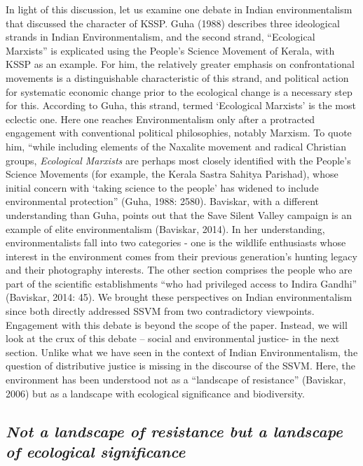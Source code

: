 \documentclass[twoside, 13pt]{article}
\begin{document}
{{{{In light of this discussion, let us examine one debate in Indian environmentalism that discussed the character of KSSP. Guha (1988) describes three ideological strands in Indian Environmentalism, and the second strand, “Ecological Marxists” is explicated using the People’s Science Movement of Kerala, with KSSP as an example. For him, the relatively greater emphasis on confrontational movements is a distinguishable characteristic of this strand, and political action for systematic economic change prior to the ecological change is a necessary step for this. According to Guha, this strand, termed ‘Ecological Marxists’ is the most eclectic one. Here one reaches Environmentalism only after a protracted engagement with conventional political philosophies, notably Marxism. To quote him, “while including elements of the Naxalite movement and radical Christian groups, \textit{Ecological Marxists} are perhaps most closely identified with the People’s Science Movements (for example, the Kerala Sastra Sahitya Parishad), whose initial concern with ‘taking science to the people’ has widened to include environmental protection” (Guha, 1988: 2580). Baviskar, with a different understanding than Guha, points out that the Save Silent Valley campaign is an example of elite environmentalism (Baviskar, 2014). In her understanding, environmentalists fall into two categories - one is the wildlife enthusiasts whose interest in the environment comes from their previous generation’s hunting legacy and their photography interests. The other section comprises the people who are part of the scientific establishments “who had privileged access to Indira Gandhi” (Baviskar, 2014: 45). We brought these perspectives on Indian environmentalism since both directly addressed SSVM from two contradictory viewpoints. Engagement with this debate is beyond the scope of the paper. Instead, we will look at the crux of this debate – social and environmental justice- in the next section.
Unlike what we have seen in the context of Indian Environmentalism, the question of distributive justice is missing in the discourse of the SSVM. Here, the environment has been understood not as a “landscape of resistance” (Baviskar, 2006) but as a landscape with ecological significance and biodiversity.}

\vspace{-.2cm}

{\fontsize{8}{10}\selectfont\subsection*{\textit{Not a landscape of resistance but a landscape of ecological significance}}}


}}}
\end{document}
